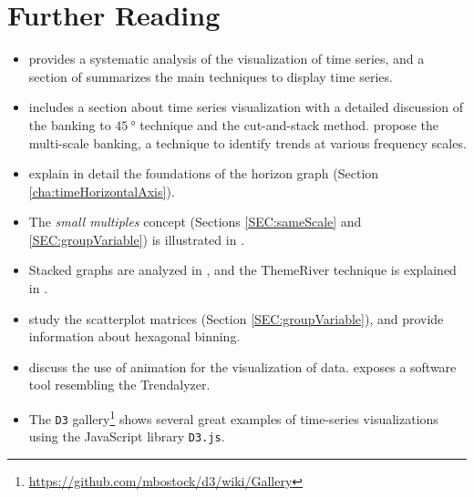 \section{Further Reading}
\label{cha:further-reading-time}

\begin{itemize}

\item \cite{Wills2011} provides a systematic analysis of the
  visualization of time series, and a section of
  \cite{Heer.Bostock.ea2010} summarizes the main techniques to
  display time series.

\item \cite{Cleveland1994} includes a section about time series
  visualization with a detailed discussion of the banking to
  $\SI{45}{\degree}$ technique and the cut-and-stack
  method. \cite{Heer.Agrawala2006} propose the multi-scale banking, a
  technique to identify trends at various frequency scales.

\item \cite{Few2008, Heer.Kong.ea2009} explain in detail the
  foundations of the horizon graph (Section
  \ref{cha:timeHorizontalAxis}).

\item The \emph{small multiples} concept (Sections
  \ref{SEC:sameScale} and \ref{SEC:groupVariable}) is illustrated
  in \cite{Tufte2001,Tufte1990}.

\item Stacked graphs are analyzed in \cite{Byron.Wattenberg2008},
  and the ThemeRiver technique is explained in
  \cite{Havre.Hetzler.ea2002}.

\item \cite{Cleveland1994, Friendly.Denis2005} study the
  scatterplot matrices (Section \ref{SEC:groupVariable}), and
  \cite{Carr.Littlefield.ea1987} provide information about
  hexagonal binning.

\item \cite{Harrower.Fabrikant2008} discuss the use of
  animation for the visualization of data. \cite{Few2007} exposes
  a software tool resembling the Trendalyzer.

\item The \texttt{D3}
  gallery\footnote{\url{https://github.com/mbostock/d3/wiki/Gallery}}
  shows several great examples of time-series visualizations using the
  JavaScript library \texttt{D3.js}.

\end{itemize}

